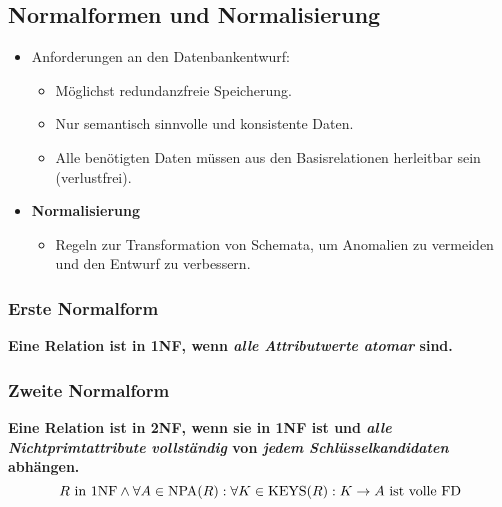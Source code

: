 		\subsection{Normalformen und Normalisierung} %
			\begin{itemize}
				\item Anforderungen an den Datenbankentwurf:
					\begin{itemize}
						\item Möglichst redundanzfreie Speicherung.
						\item Nur semantisch sinnvolle und konsistente Daten.
						\item Alle benötigten Daten müssen aus den Basisrelationen herleitbar sein (verlustfrei).
					\end{itemize}
				\item \textbf{Normalisierung}
					\begin{itemize}
						\item Regeln zur Transformation von Schemata, um Anomalien zu vermeiden und den Entwurf zu verbessern.
					\end{itemize}
			\end{itemize}


			\subsubsection{Erste Normalform} %
				\textbf{Eine Relation ist in 1NF, wenn \textit{alle Attributwerte atomar} sind.}


			\subsubsection{Zweite Normalform} %
				\textbf{Eine Relation ist in 2NF, wenn sie in 1NF ist und \textit{alle Nichtprimtattribute vollständig} von \textit{jedem Schlüsselkandidaten} abhängen.}
				\begin{equation*}
					R \text{ in 1NF} \land \forall A \in \text{NPA}(R) : \forall K \in \operatorname{KEYS}(R) : K \rightarrow A \text{ ist volle FD}
				\end{equation*}


